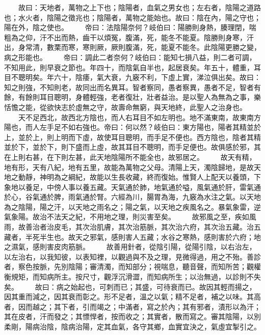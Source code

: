 \documentclass[fontset=none]{utbook}
\begin{document}
　　故曰：天地者，萬物之上下也；陰陽者，血氣之男女也；左右者，陰陽之道路也；水火者，陰陽之徵兆也；陰陽者，萬物之能始也。故曰：陰在內，陽之守也；陽在外，陰之使也。
　　帝曰：法陰陽奈何？岐伯曰：陽勝則身熱，腠理閉，喘粗為之仰，汗不出而熱，齒干以煩冤，腹滿，死，能冬不能夏。陰勝則身寒，汗出，身常清，數栗而寒，寒則厥，厥則腹滿，死，能夏不能冬。此陰陽更勝之變，病之形能也。
　　帝曰：調此二者奈何？岐伯曰：能知七損八益，則二者可調，不知用此，則早衰之節也。年四十，而陰氣自半也，起居衰矣。年五十，體重，耳目不聰明矣。年六十，陰痿，氣大衰，九竅不利，下虛上實，涕泣俱出矣。故曰：知之則強，不知則老，故同出而名異耳。智者察同，愚者察異，愚者不足，智者有餘，有餘則耳目聰明，身體輕強，老者復壯，壯者益治。是以聖人為無為之事，樂恬憺之能，從欲快志於虛無之守，故壽命無窮，與天地終，此聖人之治身也。
　　天不足西北，故西北方陰也，而人右耳目不如左明也。地不滿東南，故東南方陽也，而人左手足不如右強也。帝曰：何以然？岐伯曰：東方陽也，陽者其精並於上，並於上，則上明而下虛，故使耳目聰明，而手足不便也。西方陰也，陰者其精並於下，並於下，則下盛而上虛，故其耳目不聰明，而手足便也。故俱感於邪，其在上則右甚，在下則左甚，此天地陰陽所不能全也，故邪居之。
　　故天有精，地有形，天有八紀，地有五里，故能為萬物之父母。清陽上天，濁陰歸地，是故天地之動靜，神明為之綱紀，故能以生長收藏，終而復始。惟賢人上配天以養頭，下象地以養足，中傍人事以養五藏。天氣通於肺，地氣通於嗌，風氣通於肝，雷氣通於心，谷氣通於脾，雨氣通於腎。六經為川，腸胃為海，九竅為水注之氣。以天地為之陰陽，陽之汗，以天地之雨名之；陽之氣，以天地之疾風名之。暴氣象雷，逆氣象陽。故治不法天之紀，不用地之理，則災害至矣。
　　故邪風之至，疾如風雨，故善治者治皮毛，其次治肌膚，其次治筋脈，其次治六府，其次治五藏。治五藏者，半死半生也。故天之邪氣，感則害人五藏；水谷之寒熱，感則害於六府；地之濕氣，感則害皮肉筋脈。
　　故善用針者，從陰引陽，從陽引陰，以右治左，以左治右，以我知彼，以表知裡，以觀過與不及之理，見微得過，用之不殆。善診者，察色按脈，先別陰陽；審清濁，而知部分；視喘息，聽音聲，而知所苦；觀權衡規矩，而知病所主。按尺寸，觀浮沉滑澀，而知病所生；以治無過，以診則不失矣。
　　故曰：病之始起也，可刺而已；其盛，可待衰而已。故因其輕而揚之，因其重而減之，因其衰而彰之。形不足者，溫之以氣；精不足者，補之以味。其高者，因而越之；其下者，引而竭之；中滿者，寫之於內；其有邪者，漬形以為汗；其在皮者，汗而發之；其慓悍者，按而收之；其實者，散而寫之。審其陰陽，以別柔剛，陽病治陰，陰病治陽，定其血氣，各守其鄉，血實宜決之，氣虛宜掣引之。



\end{document}
